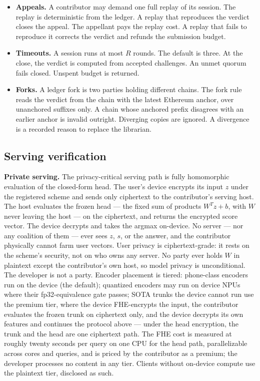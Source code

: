 \documentclass[11pt]{article}
\begin{document}
\begin{itemize}
\item \textbf{Appeals.} A contributor may demand one full replay
of its session. The replay is deterministic from the ledger. A
replay that reproduces the verdict closes the appeal. The
appellant pays the replay cost. A replay that fails to reproduce
it corrects the verdict and refunds the submission budget.
\item \textbf{Timeouts.} A session runs at most $R$ rounds. The
default is three. At the close, the verdict is computed from
accepted challenges. An unmet quorum fails closed. Unspent budget
is returned.
\item \textbf{Forks.} A ledger fork is two parties holding
different chains. The fork rule reads the verdict from the chain
with the latest Ethereum anchor, over unanchored suffixes only.
A chain whose anchored prefix disagrees with an earlier anchor is
invalid outright. Diverging copies are ignored. A divergence is a
recorded reason to replace the librarian.
\end{itemize}

\subsection{Serving verification}

\textbf{Private serving.} The privacy-critical serving
path is fully homomorphic evaluation of the closed-form head.
The user's device encrypts its input $z$ under the registered
scheme and sends only ciphertext to the contributor's serving
host. The host evaluates the frozen head --- the fixed sum of
products $W^T z + b$, with $W$ never leaving the host --- on the
ciphertext, and returns the encrypted score vector. The device
decrypts and takes the argmax on-device. No server --- nor any
coalition of them --- ever sees $z$, $s$, or the answer, and the
contributor physically cannot farm user vectors. User privacy is
ciphertext-grade: it rests on the scheme's security, not on who
owns any server. No party ever holds $W$ in plaintext except the
contributor's own host, so model privacy is unconditional. The
developer is not a party. Encoder placement is tiered:
phone-class encoders run on the device (the default); quantized
encoders may run on device NPUs where their fp32-equivalence gate
passes; SOTA trunks the device cannot run use the premium tier,
where the device FHE-encrypts the input, the contributor
evaluates the frozen trunk on ciphertext only, and the device
decrypts its own features and continues the protocol above ---
under the head encryption, the trunk and the head are one
ciphertext path. The FHE cost is measured at roughly twenty
seconds per query on one CPU for the head path, parallelizable
across cores and queries, and is priced by the contributor as a
premium; the developer processes no content in any tier.
Clients without on-device compute use the plaintext tier,
disclosed as such.
\end{document}
